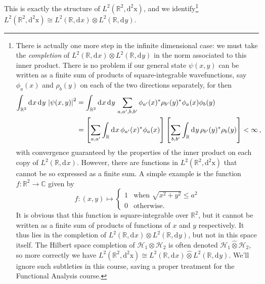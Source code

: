 \documentclass{article}
\theoremstyle{plain}\theoremheaderfont{\normalfont\itshape}\theorembodyfont{\rmfamily}\theoremseparator{.}\newtheorem*{rem}{Remark}\newtheorem*{ex}{Example}\newtheorem*{proof}{Proof}\newtheorem*{altp}{Alternative proof}
\theoremstyle{plain}\theoremheaderfont{\normalfont\bfseries}\theorembodyfont{\rmfamily}\theoremseparator{.}\newtheorem{thm}{Theorem}[section]\newtheorem{lem}[thm]{Lemma}\newtheorem{prop}[thm]{Proposition}\newtheorem*{cor}{Corollary}\newtheorem{defn}[thm]{Definition}\newtheorem{clm}[thm]{Claim}\newtheorem{clminproof}{Claim}
\theoremstyle{break}\theoremheaderfont{\normalfont\itshape}\theorembodyfont{\rmfamily}\theoremseparator{.\medskip}\newtheorem*{proofskip}{Proof}\newtheorem*{exs}{Examples}\newtheorem*{rems}{Remarks}
\theoremstyle{break}\theoremheaderfont{\normalfont\bfseries}\theorembodyfont{\rmfamily}\theoremseparator{.\medskip}\newtheorem{lemskip}[thm]{Lemma}\newtheorem{defnskip}[thm]{Definition}\newtheorem{propskip}[thm]{Proposition}\newtheorem{thmskip}[thm]{Theorem}
\numberwithin{equation}{section}
\newcommand{\dd}[2][]{\mathrm{d}^{#1} #2\,}
\renewcommand{\d}[2][]{\mathrm{d}^{#1} #2}
\newcommand{\vb}[1]{\bm{\mathrm{#1}}}
\newcommand{\abs}[1]{\left| #1 \right|}
\newcommand{\hb}{\mathcal{H}}
\newcommand{\RR}{\mathbb{R}}
\newcommand{\CC}{\mathbb{C}}
\begin{document}
    This is exactly the structure of \(L^2(\RR^2,\d[2]{\vb{x}})\), and we identify\footnote{There is actually one more step in the infinite dimensional case: we must take the \textit{completion} of \(L^2(\RR,\d{x})\otimes L^2(\RR,\d{y})\) in the norm associated to this inner product. There is no problem if our general state \(\psi(x,y)\) can be written as a finite sum of products of square-integrable wavefunctions, say \(\phi_a(x)\) and \(\rho_b(y)\) on each of the two directions separately, for then
    \begin{align}
        \int_{\RR^2}\dd{x}\dd{y}\abs{\psi(x,y)}^2&=\int_{\RR^2}\dd{x}\dd{y}\sum_{a,a',b,b'}\phi_{a'}(x)^*\rho_{b'}(y)^*\phi_a(x)\phi_b(y)\notag\\
        &=\left[\sum_{a,a'}\int_{\RR}\dd{x}\phi_{a'}(x)^*\phi_a(x)\right]\left[\sum_{b,b'}\int_{\RR}\dd{y}\rho_{b'}(y)^*\rho_b(y)\right]<\infty\,,
    \end{align}
    with convergence guaranteed by the properties of the inner product on each copy of \(L^2(\RR,\d{x})\). However, there are functions in \(L^2(\RR^2,\d[2]{\vb{x}})\) that cannot be so expressed as a finite sum. A simple example is the function \(f:\RR^2\to\CC\) given by
    \begin{equation}
        f:(x,y)\mapsto\begin{cases}
        1 & \text{when }\sqrt{x^2+y^2}\le a^2\\
        0 & \text{otherwise}.
    \end{cases}
    \end{equation}
    It is obvious that this function is square-integrable over \(\RR^2\), but it cannot be written as a finite sum of products of functions of \(x\) and \(y\) respectively. It thus lies in the completion of \(L^2(\RR,\d{x})\otimes L^2(\RR,\d{y})\), but not in this space itself. The Hilbert space completion of \(\hb_1\otimes\hb_2\) is often denoted \(\hb_1\hat{\otimes}\hb_2\), so more correctly we have \(L^2(\RR^2,\d[2]{\vb{x}})\cong L^2(\RR,\d{x})\hat{\otimes}L^2(\RR,\d{y})\). We'll ignore such subtleties in this course, saving a proper treatment for the Functional Analysis course.} \(L^2(\RR^2,\d[2]{\vb{x}})\cong L^2(\RR,\d{x})\otimes L^2(\RR,\d{y})\).
\end{document}
